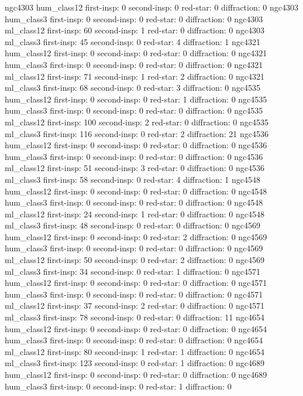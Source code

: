 ngc4303 hum_class12 first-insp: 0 second-insp:  0 red-star:  0 diffraction:  0
ngc4303 hum_class3 first-insp: 0 second-insp:  0 red-star:  0 diffraction:  0
ngc4303 ml_class12 first-insp: 60 second-insp:  1 red-star:  0 diffraction:  0
ngc4303 ml_class3 first-insp: 45 second-insp:  0 red-star:  4 diffraction:  1
ngc4321 hum_class12 first-insp: 0 second-insp:  0 red-star:  0 diffraction:  0
ngc4321 hum_class3 first-insp: 0 second-insp:  0 red-star:  0 diffraction:  0
ngc4321 ml_class12 first-insp: 71 second-insp:  1 red-star:  2 diffraction:  0
ngc4321 ml_class3 first-insp: 68 second-insp:  0 red-star:  3 diffraction:  0
ngc4535 hum_class12 first-insp: 0 second-insp:  0 red-star:  1 diffraction:  0
ngc4535 hum_class3 first-insp: 0 second-insp:  0 red-star:  0 diffraction:  0
ngc4535 ml_class12 first-insp: 100 second-insp:  2 red-star:  0 diffraction:  0
ngc4535 ml_class3 first-insp: 116 second-insp:  0 red-star:  2 diffraction:  21
ngc4536 hum_class12 first-insp: 0 second-insp:  0 red-star:  0 diffraction:  0
ngc4536 hum_class3 first-insp: 0 second-insp:  0 red-star:  0 diffraction:  0
ngc4536 ml_class12 first-insp: 51 second-insp:  3 red-star:  0 diffraction:  0
ngc4536 ml_class3 first-insp: 58 second-insp:  0 red-star:  4 diffraction:  1
ngc4548 hum_class12 first-insp: 0 second-insp:  0 red-star:  0 diffraction:  0
ngc4548 hum_class3 first-insp: 0 second-insp:  0 red-star:  0 diffraction:  0
ngc4548 ml_class12 first-insp: 24 second-insp:  1 red-star:  0 diffraction:  0
ngc4548 ml_class3 first-insp: 48 second-insp:  0 red-star:  0 diffraction:  0
ngc4569 hum_class12 first-insp: 0 second-insp:  0 red-star:  2 diffraction:  0
ngc4569 hum_class3 first-insp: 0 second-insp:  0 red-star:  0 diffraction:  0
ngc4569 ml_class12 first-insp: 50 second-insp:  0 red-star:  2 diffraction:  0
ngc4569 ml_class3 first-insp: 34 second-insp:  0 red-star:  1 diffraction:  0
ngc4571 hum_class12 first-insp: 0 second-insp:  0 red-star:  0 diffraction:  0
ngc4571 hum_class3 first-insp: 0 second-insp:  0 red-star:  0 diffraction:  0
ngc4571 ml_class12 first-insp: 37 second-insp:  2 red-star:  0 diffraction:  0
ngc4571 ml_class3 first-insp: 78 second-insp:  0 red-star:  0 diffraction:  11
ngc4654 hum_class12 first-insp: 0 second-insp:  0 red-star:  0 diffraction:  0
ngc4654 hum_class3 first-insp: 0 second-insp:  0 red-star:  0 diffraction:  0
ngc4654 ml_class12 first-insp: 80 second-insp:  1 red-star:  1 diffraction:  0
ngc4654 ml_class3 first-insp: 123 second-insp:  0 red-star:  1 diffraction:  0
ngc4689 hum_class12 first-insp: 0 second-insp:  0 red-star:  0 diffraction:  0
ngc4689 hum_class3 first-insp: 0 second-insp:  0 red-star:  1 diffraction:  0
